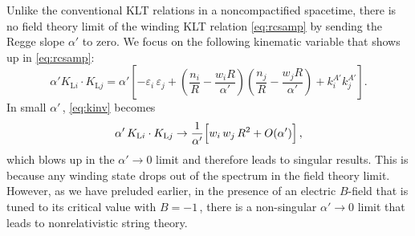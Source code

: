 \documentclass[11pt]{article}
\newcommand{\be}{\begin{equation}}
\newcommand{\ee}{\end{equation}}
\newcommand{\lr}{\left (}
\newcommand{\rr}{\right )}
\newcommand{\ls}{\left [}
\newcommand{\rs}{\right ]}
\begin{document}
Unlike the conventional KLT relations in a noncompactified spacetime, there is no field theory limit of the winding KLT relation \eqref{eq:rcsamp} by sending the Regge slope $\alpha'$ to zero. We focus on the following kinematic variable that shows up in \eqref{eq:rcsamp}:
%
\be \label{eq:kinv}
    \alpha' K_{\text{L}i} \cdot K_{\text{L}j} = \alpha' \ls - \varepsilon_i \, \varepsilon_j + \lr \frac{n_i}{R} - \frac{w_i R}{\alpha'} \rr \lr \frac{n_j}{R} - \frac{w_j R}{\alpha'} \rr + k_i^{A'} k_j^{A'} \rs.
\ee
%
In small $\alpha'$\,, \eqref{eq:kinv} becomes
%
\be \label{eq:daklkl}
    \alpha' \, K_{\text{L}i} \cdot K_{\text{L}j} \rightarrow \frac{1}{\alpha'} \Bigl[ w_i \, w_j \, R^2 + O (\alpha') \Bigr]\,,
\ee
%
which blows up in the $\alpha' \rightarrow 0$ limit and therefore leads to singular results. This is because any winding state drops out of the spectrum in the field theory limit. 
However, as we have preluded earlier, in the presence of an electric $B$-field that is tuned to its critical value with $B = -1$\,, there is a non-singular $\alpha' \rightarrow 0$ limit that leads to nonrelativistic string theory.
\end{document}
